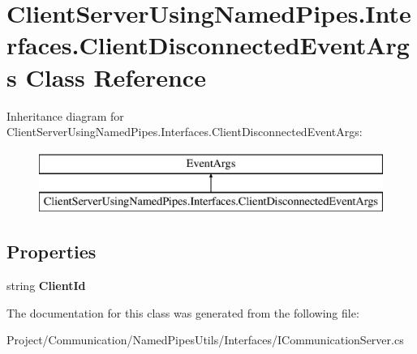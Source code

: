 \hypertarget{class_client_server_using_named_pipes_1_1_interfaces_1_1_client_disconnected_event_args}{}\section{Client\+Server\+Using\+Named\+Pipes.\+Interfaces.\+Client\+Disconnected\+Event\+Args Class Reference}
\label{class_client_server_using_named_pipes_1_1_interfaces_1_1_client_disconnected_event_args}
Inheritance diagram for Client\+Server\+Using\+Named\+Pipes.\+Interfaces.\+Client\+Disconnected\+Event\+Args\+:\begin{figure}[H]
\begin{center}
\leavevmode
\includegraphics[height=2.000000cm]{class_client_server_using_named_pipes_1_1_interfaces_1_1_client_disconnected_event_args}
\end{center}
\end{figure}
\subsection*{Properties}
\begin{DoxyCompactItemize}
\item 
\mbox{\label{class_client_server_using_named_pipes_1_1_interfaces_1_1_client_disconnected_event_args_a7aa5e7a6eab6f1f6f39ece0829c417e7}} 
string {\bfseries Client\+Id}
\end{DoxyCompactItemize}


The documentation for this class was generated from the following file\+:\begin{DoxyCompactItemize}
\item 
Project/\+Communication/\+Named\+Pipes\+Utils/\+Interfaces/I\+Communication\+Server.\+cs\end{DoxyCompactItemize}
